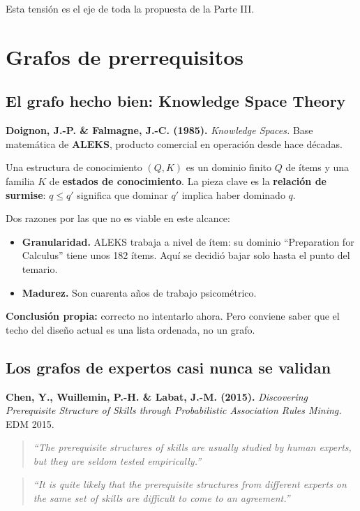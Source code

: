 \documentclass[11pt,a4paper]{article}
\newcommand{\cita}[1]{\begin{quote}\itshape\small #1\end{quote}}
\begin{document}
Esta tensión es el eje de toda la propuesta de la Parte III.

\section{Grafos de prerrequisitos}

\subsection{El grafo hecho bien: Knowledge Space Theory}

\textbf{Doignon, J.-P. \& Falmagne, J.-C. (1985).} \emph{Knowledge Spaces.} Base matemática de \textbf{ALEKS}, producto comercial en operación desde hace décadas.

Una estructura de conocimiento $(Q, K)$ es un dominio finito $Q$ de ítems y una familia $K$ de \textbf{estados de conocimiento}. La pieza clave es la \textbf{relación de surmise}: $q \leq q'$ significa que dominar $q'$ implica haber dominado $q$.

Dos razones por las que no es viable en este alcance:

\begin{itemize}
\item \textbf{Granularidad.} ALEKS trabaja a nivel de ítem: su dominio ``Preparation for Calculus'' tiene unos 182 ítems. Aquí se decidió bajar solo hasta el punto del temario.
\item \textbf{Madurez.} Son cuarenta años de trabajo psicométrico.
\end{itemize}

\textbf{Conclusión propia:} correcto no intentarlo ahora. Pero conviene saber que el techo del diseño actual es una lista ordenada, no un grafo.

\subsection{Los grafos de expertos casi nunca se validan}

\textbf{Chen, Y., Wuillemin, P.-H. \& Labat, J.-M. (2015).} \emph{Discovering Prerequisite Structure of Skills through Probabilistic Association Rules Mining.} EDM 2015.

\cita{``The prerequisite structures of skills are usually studied by human experts, but they are seldom tested empirically.''}

\cita{``It is quite likely that the prerequisite structures from different experts on the same set of skills are difficult to come to an agreement.''}
\end{document}
